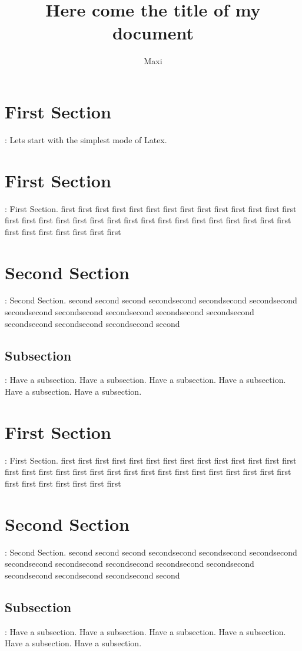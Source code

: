 \documentclass[a4paper,12pt]{article}
\title{Here come the title of my document}
\author{Maxi}
\date{}
\begin{document}
	\maketitle
	\section*{First Section}:
	Lets start with the simplest mode of Latex.
	\section*{First Section}:
	First Section. first first first first first first first first first first first first first first first first first first first first first first first first first first first first first first first first first first first first first first 
	
	\section{Second Section}:
	Second Section. second second second secondsecond secondsecond secondsecond secondsecond secondsecond secondsecond secondsecond secondsecond secondsecond secondsecond secondsecond second
	\subsection{Subsection}:
	Have a subsection.	Have a subsection.	Have a subsection.	Have a subsection.	Have a subsection.	Have a subsection.
	
	\section{First Section}:
	First Section. first first first first first first first first first first first first first first first first first first first first first first first first first first first first first first first first first first first first first first 
	
	\section{Second Section}:
	Second Section. second second second secondsecond secondsecond secondsecond secondsecond secondsecond secondsecond secondsecond secondsecond secondsecond secondsecond secondsecond second
	\subsection{Subsection}:
	Have a subsection.	Have a subsection.	Have a subsection.	Have a subsection.	Have a subsection.	Have a subsection.
	
\end{document}
